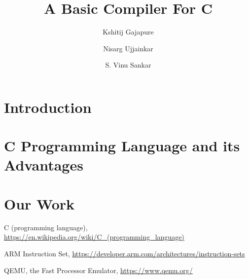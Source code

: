 \documentclass{clv3}
\begin{document}
    \title{A Basic Compiler For C}
    \author{Kshitij Gajapure}

    \author{Nisarg Ujjainkar}

    \author{S. Vinu Sankar}
    \maketitle
    \section{Introduction}
    
    \section{C Programming Language and its Advantages}
    
    \section{Our Work}
    
    \begin{thebibliography}{9}
        C (programming language), \url{https://en.wikipedia.org/wiki/C_(programming_language)}

        ARM Instruction Set, \url{https://developer.arm.com/architectures/instruction-sets}

        QEMU, the Fast Processor Emulator, \url{https://www.qemu.org/}
    \end{thebibliography}
\end{document}
